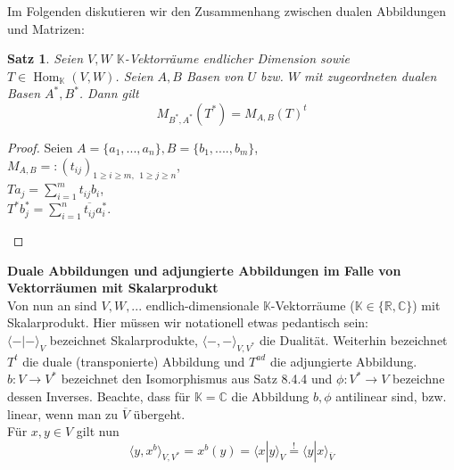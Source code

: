 \documentclass[12pt,a4paper]{article}
\newtheorem{theorem}{Satz}
\theoremstyle{definition}
\theoremstyle{remark}
\renewcommand{\bar}[1]{\overline{#1}}
\DeclareMathOperator{\Hom}{Hom}
\begin{document}
	Im Folgenden diskutieren wir den Zusammenhang zwischen dualen Abbildungen und Matrizen:
	\begin{theorem}
		Seien $V,W$ $\mathbb{K}$-Vektorräume endlicher Dimension sowie $T \in \Hom_{\mathbb{K}}(V,W)$. Seien $A,B$ Basen von $U$ bzw. $W$ mit zugeordneten dualen Basen $A^*, B^*$. Dann gilt
		\begin{equation}
			M_{B^*,A^*}(T^*) = M_{A,B}(T)^t
		\end{equation}		 
	\end{theorem}
	\begin{proof}
		Seien $A = \{ a_1,...,a_n \}, B = \{ b_1,....,b_m \}$, \\
		 $M_{A,B} =: (t_{ij})_{ 1 \geq i \geq m, \ \ 1 \geq j \geq n}$, \\ 
		 $T a_j = \sum_{i = 1}^m t_{ij} b_i$,\\
		 $T^* b_j^* = \sum_{i = 1}^n \bar{t_{ij}} a_i^*$.
		\begin{center}
		\end{center}
	\end{proof}
	\textbf{Duale Abbildungen und adjungierte Abbildungen im Falle von Vektorräumen mit Skalarprodukt} \\
	Von nun an sind $V,W,...$ endlich-dimensionale $\mathbb{K}$-Vektorräume ($\mathbb{K} \in \{ \mathbb{R}, \mathbb{C} \}$) mit Skalarprodukt. Hier müssen wir notationell etwas pedantisch sein: \\
	$\langle -|- \rangle_V$ bezeichnet Skalarprodukte, $\langle -,- \rangle_{V,V^*}$ die Dualität. Weiterhin bezeichnet $T^t$ die duale (transponierte) Abbildung und $T^{ad}$ die adjungierte Abbildung. $b: V \rightarrow V^*$ bezeichnet den Isomorphismus aus Satz 8.4.4 und $\phi: V^* \rightarrow V$ bezeichne dessen Inverses. Beachte, dass für $\mathbb{K}=\mathbb{C}$ die Abbildung $b,\phi$ antilinear sind, bzw. linear, wenn man zu $\bar{V}$ übergeht. \\
	Für $x,y \in V$ gilt nun
	\begin{equation}
		\langle y, x^b \rangle_{V,V^*} = x^b(y) = \langle x | y \rangle_V \overset{!}{=} \langle y | x \rangle_{\bar{V}}
	\end{equation}
\end{document}

